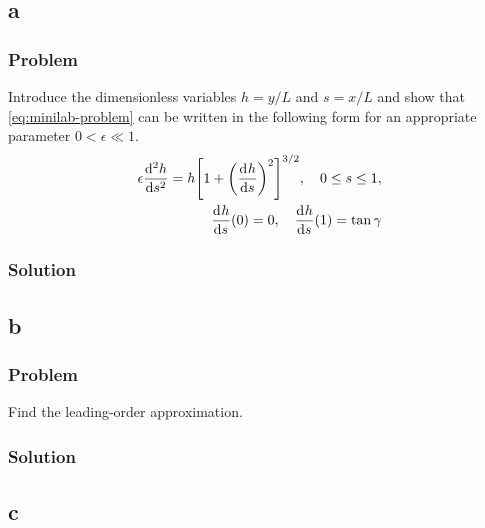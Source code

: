 \documentclass[12pt,twoside]{article}
\begin{document}
\subsection{a}
\label{sec:minilab-part-a}
\subsubsection*{Problem}
Introduce the dimensionless variables $h=y/L$ and $s=x/L$ and show that
\cref{eq:minilab-problem} can be written in the following form for an
appropriate parameter $0<\epsilon\ll1$.
\begin{equation}
  \label{eq:minilab-problem-part-a}
  \begin{aligned}
    \epsilon\od[2]{h}{s} = h{\left[ 1+{\left( \od{h}{s} \right)}^2
      \right]}^{3/2},\quad 0\le s\le1, \\
    \od{h}{s}(0) = 0,\quad \od{h}{s}(1) = \tan\gamma
  \end{aligned}
\end{equation}
\subsubsection*{Solution}
\todo{}

\subsection{b}
\label{sec:minilab-part-b}
\subsubsection*{Problem}
Find the leading-order approximation.
\subsubsection*{Solution}
\todo{}

\subsection{c}
\label{sec:minilab-part-c}
\end{document}
